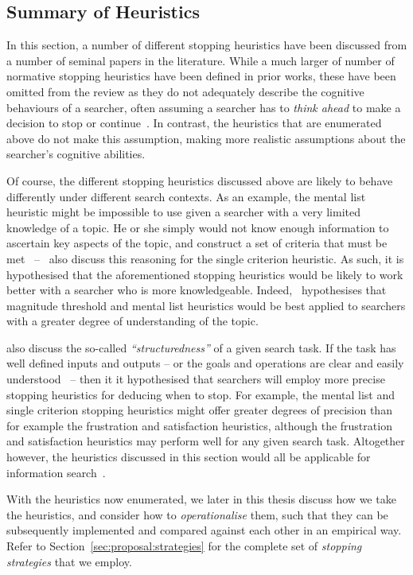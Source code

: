 \subsection{Summary of Heuristics}
In this section, a number of different stopping heuristics have been discussed from a number of seminal papers in the literature. While a much larger of number of normative stopping heuristics have been defined in prior works, these have been omitted from the review as they do not adequately describe the cognitive behaviours of a searcher, often assuming a searcher has to \emph{think ahead} to make a decision to stop or continue~\citep{browne2004stopping_rules}. In contrast, the heuristics that are enumerated above do not make this assumption, making more realistic assumptions about the searcher's cognitive abilities.

Of course, the different stopping heuristics discussed above are likely to behave differently under different search contexts. As an example, the mental list heuristic might be impossible to use given a searcher with a very limited knowledge of a topic. He or she simply would not know enough information to ascertain key aspects of the topic, and construct a set of criteria that must be met~\citep{browne2005stopping_rules} --~\cite{gigerenzer1999betting} also discuss this reasoning for the single criterion heuristic. As such, it is hypothesised that the aforementioned stopping heuristics would be likely to work better with a searcher who is more knowledgeable. Indeed,~\cite{browne2005stopping_rules} hypothesises that magnitude threshold and mental list heuristics would be best applied to searchers with a greater degree of understanding of the topic.

\cite{browne2005stopping_rules} also discuss the so-called \emph{``structuredness''} of a given search task. If the task has well defined inputs and outputs -- or the goals and operations are clear and easily understood~\citep{simon1996sciences} -- then it it hypothesised that searchers will employ more precise stopping heuristics for deducing when to stop. For example, the mental list and single criterion stopping heuristics might offer greater degrees of precision than for example the frustration and satisfaction heuristics, although the frustration and satisfaction heuristics may perform well for any given search task. Altogether however, the heuristics discussed in this section would all be applicable for information search~\citep{browne2005stopping_rules}.

With the heuristics now enumerated, we later in this thesis discuss how we take the heuristics, and consider how to \emph{operationalise} them, such that they can be subsequently implemented and compared against each other in an empirical way. Refer to Section~\ref{sec:proposal:strategies} for the complete set of \emph{stopping strategies} that we employ.

